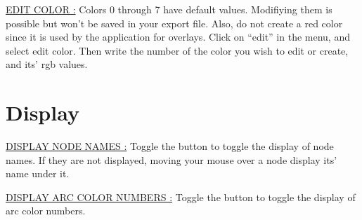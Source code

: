\documentclass[pidr]{tnreport}
\begin{document}
\underline{EDIT COLOR :}
Colors 0 through 7 have default values. Modifiying them is possible but won’t be saved in your export file.
Also, do not create a red color since it is used by the application for overlays.
Click on “edit” in the menu, and select edit color. Then write the number of the color you wish to edit or create, and its’ rgb values.

\section{Display}


\underline{DISPLAY NODE NAMES :}
Toggle the button to toggle the display of node names. If they are not displayed, moving your mouse over a node display its’ name under it.

\underline{DISPLAY ARC COLOR NUMBERS :}
Toggle the button to toggle the display of arc color numbers.

\cleardoublepage
\end{document}
